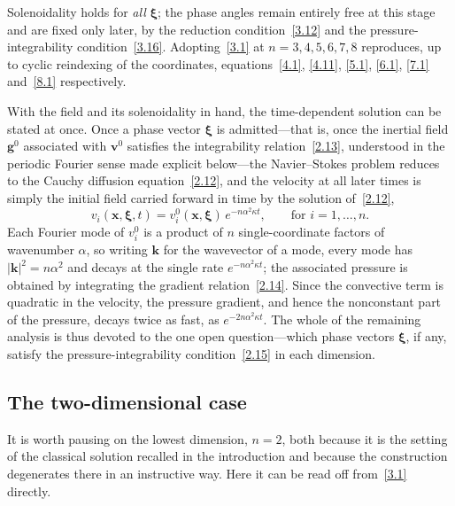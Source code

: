 \documentclass[11pt]{jfm}
\numberwithin{equation}{section}
\begin{document}
Solenoidality holds for \emph{all} $\boldsymbol{\xi}$; the phase angles remain entirely free at
this stage and are fixed only later, by the reduction condition~\eqref{3.12} and the
pressure-integrability condition~\eqref{3.16}. Adopting~\eqref{3.1} at $n=3,4,5,6,7,8$
reproduces, up to cyclic reindexing of the coordinates, equations~\eqref{4.1}, \eqref{4.11},
\eqref{5.1}, \eqref{6.1}, \eqref{7.1} and~\eqref{8.1} respectively.

With the field and its solenoidality in hand, the time-dependent solution can be stated at once.
Once a phase vector $\boldsymbol{\xi}$ is admitted---that is, once the inertial field $\boldsymbol{g}^0$ associated with $\boldsymbol{v}^0$ satisfies the integrability relation~\eqref{2.13}, understood in the periodic Fourier sense made
explicit below---the Navier--Stokes problem reduces to the Cauchy
diffusion equation~\eqref{2.12}, and the velocity at all later times is simply the initial field
carried forward in time by the solution of~\eqref{2.12},
\begin{equation}
\label{3.5}
v_i(\boldsymbol{x}, \boldsymbol{\xi}, t) =  v_i^0(\boldsymbol{x}, \boldsymbol{\xi})\, e^{-n\alpha^2 \kappa t}, \qquad \text{for } i = 1, \dots, n.
\end{equation}
Each Fourier mode of $v_i^0$ is a product of $n$ single-coordinate factors of wavenumber
$\alpha$, so writing $\boldsymbol{k}$ for the wavevector of a mode, every mode has
$|\boldsymbol{k}|^2 = n\alpha^2$ and decays at the single rate
$e^{-n\alpha^2\kappa t}$; the associated pressure is obtained by integrating the
gradient relation~\eqref{2.14}. Since the convective term is quadratic in the velocity, the
pressure gradient, and hence the nonconstant part of the pressure, decays twice as fast, as
$e^{-2n\alpha^2\kappa t}$. The whole of the remaining analysis is thus
devoted to the one open question---which phase vectors $\boldsymbol{\xi}$, if any, satisfy the
pressure-integrability condition~\eqref{2.15} in each dimension.

\subsection{The two-dimensional case}
\label{subsec:2D}
It is worth pausing on the lowest dimension, $n=2$, both because it is the setting of the
classical solution recalled in the introduction and because the construction degenerates there in
an instructive way. Here it can be read off from~\eqref{3.1} directly.
\end{document}

